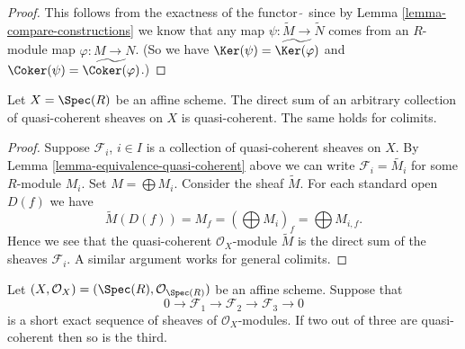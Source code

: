 \begin{proof}
This follows from the exactness of the functor $\widetilde{\ }$
since by Lemma \ref{lemma-compare-constructions} we know that any map
$\psi : \widetilde{M} \to \widetilde{N}$ comes from
an $R$-module map $\varphi : M \to N$. (So we have
$\Ker(\psi) = \widetilde{\Ker(\varphi)}$ and
$\Coker(\psi) = \widetilde{\Coker(\varphi)}$.)
\end{proof}

\begin{lemma}
\label{lemma-colimit-quasi-coherent}
Let $X = \Spec(R)$ be an affine scheme.
The direct sum of an arbitrary collection of quasi-coherent sheaves
on $X$ is quasi-coherent. The same holds for colimits.
\end{lemma}

\begin{proof}
Suppose $\mathcal{F}_i$, $i \in I$ is a collection of quasi-coherent
sheaves on $X$. By Lemma \ref{lemma-equivalence-quasi-coherent}
above we can write $\mathcal{F}_i = \widetilde{M_i}$ for some $R$-module
$M_i$. Set $M = \bigoplus M_i$. Consider the sheaf $\widetilde{M}$.
For each standard open $D(f)$ we have
$$
\widetilde{M}(D(f)) = M_f =
\left(\bigoplus M_i\right)_f =
\bigoplus M_{i, f}.
$$
Hence we see that the quasi-coherent $\mathcal{O}_X$-module
$\widetilde{M}$ is the direct sum of the sheaves $\mathcal{F}_i$.
A similar argument works for general colimits.
\end{proof}

\begin{lemma}
\label{lemma-extension-quasi-coherent}
Let $(X, \mathcal{O}_X) = (\Spec(R), \mathcal{O}_{\Spec(R)})$
be an affine scheme. Suppose that
$$
0 \to
\mathcal{F}_1 \to
\mathcal{F}_2 \to
\mathcal{F}_3 \to
0
$$
is a short exact sequence of sheaves of $\mathcal{O}_X$-modules.
If two out of three are quasi-coherent then so is the third.
\end{lemma}


